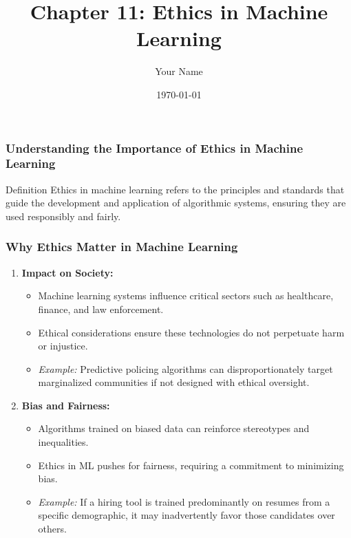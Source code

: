 \documentclass{beamer}
\title{Chapter 11: Ethics in Machine Learning}
\author{Your Name}
\institute{Your Institution}
\date{\today}
\begin{document}
\frame{\titlepage}

\begin{frame}[fragile]
    \titlepage
\end{frame}

\begin{frame}[fragile]
    \frametitle{Understanding the Importance of Ethics in Machine Learning}
    \begin{block}{Definition}
        Ethics in machine learning refers to the principles and standards that guide the development and application of algorithmic systems, ensuring they are used responsibly and fairly.
    \end{block}
\end{frame}

\begin{frame}[fragile]
    \frametitle{Why Ethics Matter in Machine Learning}
    \begin{enumerate}
        \item \textbf{Impact on Society:}
            \begin{itemize}
                \item Machine learning systems influence critical sectors such as healthcare, finance, and law enforcement. 
                \item Ethical considerations ensure these technologies do not perpetuate harm or injustice.
                \item \textit{Example:} Predictive policing algorithms can disproportionately target marginalized communities if not designed with ethical oversight.
            \end{itemize}
        
        \item \textbf{Bias and Fairness:}
            \begin{itemize}
                \item Algorithms trained on biased data can reinforce stereotypes and inequalities.
                \item Ethics in ML pushes for fairness, requiring a commitment to minimizing bias.
                \item \textit{Example:} If a hiring tool is trained predominantly on resumes from a specific demographic, it may inadvertently favor those candidates over others.
            \end{itemize}
    \end{enumerate}
\end{frame}
\end{document}
